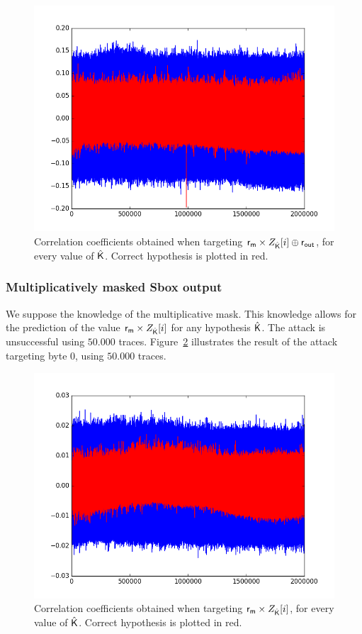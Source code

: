 \begin{figure}[H]
	\centering 
	\includegraphics[scale=0.4]{figures/CPA1O_2Mpts_trickedaS+b0_1ktraces.png}
	\caption{Correlation coefficients obtained when targeting $\mathsf{r_m} \times Z_{\hat{\mathsf{K}}}[i] \oplus \mathsf{r_{out}}$, for every value of $\hat{\mathsf{K}}$. Correct hypothesis is plotted  in red. }
	\label{fig:CPA1O_trickedaZb1}
\end{figure}

\subsubsection{Multiplicatively masked Sbox output}
We suppose the knowledge of the multiplicative mask. This knowledge allows for the prediction of the value $\mathsf{r_m} \times Z_{\hat{\mathsf{K}}}[i]$ for any hypothesis $\hat{\mathsf{K}}$.
The attack is unsuccessful using $50.000$ traces.
Figure~\ref{fig:CPA1O_trickedaZ1} illustrates the result of the attack targeting byte 0, using $50.000$ traces.

\begin{figure}[H]
	\centering 
	\includegraphics[scale=0.4]{figures/CPA1O_2Mpts_trickedaS0traces.png}
	\caption{Correlation coefficients obtained when targeting $\mathsf{r_m} \times Z_{\hat{\mathsf{K}}}[i]$, for every value of $\hat{\mathsf{K}}$. Correct hypothesis is plotted  in red. }
	\label{fig:CPA1O_trickedaZ1}
\end{figure}

